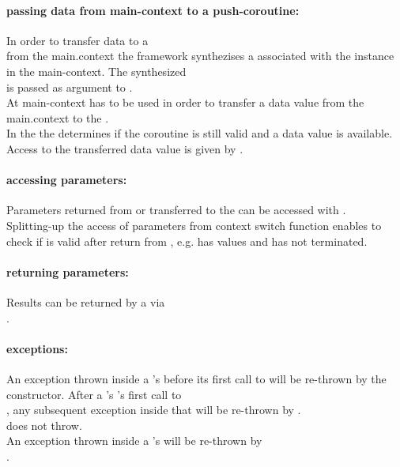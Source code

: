 \paragraph*{passing data from main-context to a push-coroutine:}
In order to transfer data to a\\
\pushcoro from the main.context the framework synthezises a \pullcoro associated
with the \pushcoro instance in the main-context. The synthesized\\
\pullcoro is passed as argument to \corofunction.\\
At main-context \pushcoroop has to be used in order to transfer a data value
from the main.context to the \corofunction.\\
In the \corofunction the \pullcorobool determines if the coroutine is still valid and
a data value is available.\\
Access to the transferred data value is given by \pullcoroget.

\paragraph*{accessing parameters:}
Parameters returned from or transferred to the \corofunction can be accessed
with \pullcoroget.\\
\newline
Splitting-up the access of parameters from context switch function enables to
check if \pullcoro is valid after return from \pullcoroop, e.g. \pullcoro has
values and \corofunction has not terminated.

\paragraph*{returning parameters:}
Results can be returned by a \corofunction via\\
\pushcoroop.\\

\paragraph*{exceptions:}
An exception thrown inside a \pullcoro's \corofunction before its first call to
\pushcoroop will be re-thrown by the \pullcoro constructor. After a \pullcoro's
\corofunction's first call to\\
\pushcoroop, any subsequent exception inside that
\corofunction will be re-thrown by \pullcoroop.\\
\pullcoroget does not throw.\\
\newline
An exception thrown inside a \pushcoro's \corofunction will be re-thrown by\\
\pushcoroop.


